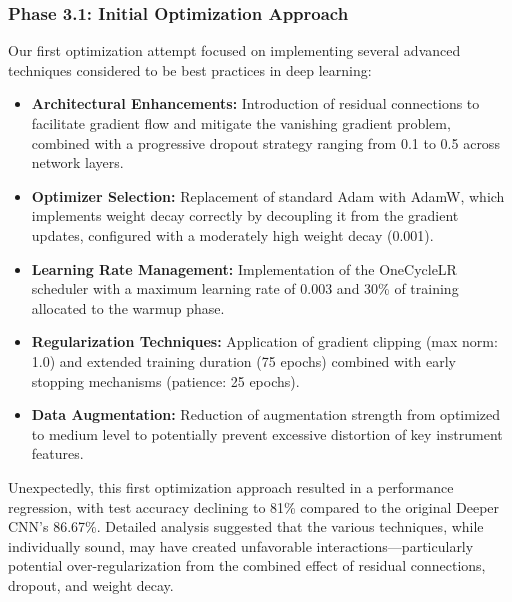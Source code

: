 \subsubsection{Phase 3.1: Initial Optimization Approach}
Our first optimization attempt focused on implementing several advanced techniques considered to be best practices in deep learning:
\begin{itemize}
    \item \textbf{Architectural Enhancements:} Introduction of residual connections to facilitate gradient flow and mitigate the vanishing gradient problem, combined with a progressive dropout strategy ranging from 0.1 to 0.5 across network layers.
    \item \textbf{Optimizer Selection:} Replacement of standard Adam with AdamW, which implements weight decay correctly by decoupling it from the gradient updates, configured with a moderately high weight decay (0.001).
    \item \textbf{Learning Rate Management:} Implementation of the OneCycleLR scheduler with a maximum learning rate of 0.003 and 30\% of training allocated to the warmup phase.
    \item \textbf{Regularization Techniques:} Application of gradient clipping (max norm: 1.0) and extended training duration (75 epochs) combined with early stopping mechanisms (patience: 25 epochs).
    \item \textbf{Data Augmentation:} Reduction of augmentation strength from optimized to medium level to potentially prevent excessive distortion of key instrument features.
\end{itemize}
Unexpectedly, this first optimization approach resulted in a performance regression, with test accuracy declining to 81\% compared to the original Deeper CNN's 86.67\%. Detailed analysis suggested that the various techniques, while individually sound, may have created unfavorable interactions—particularly potential over-regularization from the combined effect of residual connections, dropout, and weight decay.

